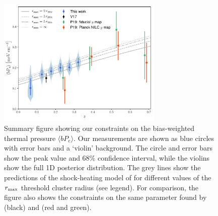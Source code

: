 \documentclass[useAMS,usenatbib]{mn2e}
\begin{document}
      \begin{figure}
        \centering
        \includegraphics[width=0.7\textwidth]{by.pdf}
        \caption{Summary figure showing our constraints on the bias-weighted thermal pressure $\langle bP_e\rangle$. Our measurements are shown as blue circles with error bars and a `violin' background. The circle and error bars show the peak value and 68\% confidence interval, while the violins show the full 1D posterior distribution. The grey lines show the predictions of the shock-heating model of \citet{2012ApJ...758...75B} for different values of the $r_{\rm max}$ threshold cluster radius (see legend). For comparison, the figure also shows the constraints on the same parameter found by \citet{2017MNRAS.467.2315V} (black) and \citet{2019arXiv190413347P} (red and green).}
        \label{fig:by}
      \end{figure}
\end{document}
